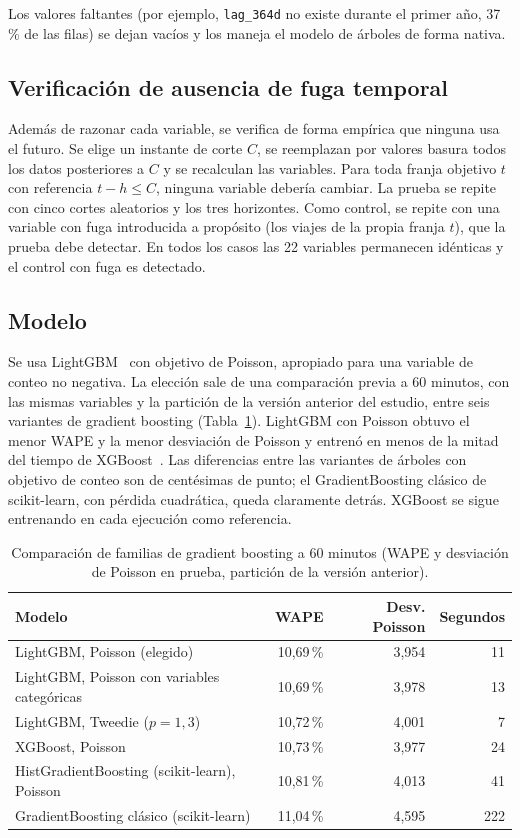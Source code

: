 \documentclass[11pt,a4paper]{article}
\begin{document}
Los valores faltantes (por ejemplo, \texttt{lag\_364d} no existe durante el primer año, 37\,\% de las filas) se dejan vacíos y los maneja el modelo de árboles de forma nativa.

\subsection{Verificación de ausencia de fuga temporal}

Además de razonar cada variable, se verifica de forma empírica que ninguna usa el futuro. Se elige un instante de corte $C$, se reemplazan por valores basura todos los datos posteriores a $C$ y se recalculan las variables. Para toda franja objetivo $t$ con referencia $t-h \le C$, ninguna variable debería cambiar. La prueba se repite con cinco cortes aleatorios y los tres horizontes. Como control, se repite con una variable con fuga introducida a propósito (los viajes de la propia franja $t$), que la prueba debe detectar. En todos los casos las 22 variables permanecen idénticas y el control con fuga es detectado.

\subsection{Modelo}

Se usa LightGBM~\cite{ke2017lightgbm} con objetivo de Poisson, apropiado para una variable de conteo no negativa. La elección sale de una comparación previa a 60 minutos, con las mismas variables y la partición de la versión anterior del estudio, entre seis variantes de gradient boosting (Tabla~\ref{tab:familias}). LightGBM con Poisson obtuvo el menor WAPE y la menor desviación de Poisson y entrenó en menos de la mitad del tiempo de XGBoost~\cite{chen2016xgboost}. Las diferencias entre las variantes de árboles con objetivo de conteo son de centésimas de punto; el GradientBoosting clásico de scikit-learn, con pérdida cuadrática, queda claramente detrás. XGBoost se sigue entrenando en cada ejecución como referencia.

\begin{table}[H]
  \centering
  \caption{Comparación de familias de gradient boosting a 60 minutos (WAPE y desviación de Poisson en prueba, partición de la versión anterior).}
  \label{tab:familias}
  \small
  \begin{tabular}{lrrr}
    \toprule
    Modelo & WAPE & Desv. Poisson & Segundos \\
    \midrule
    LightGBM, Poisson (elegido) & 10,69\,\% & 3,954 & 11 \\
    LightGBM, Poisson con variables categóricas & 10,69\,\% & 3,978 & 13 \\
    LightGBM, Tweedie ($p=1{,}3$) & 10,72\,\% & 4,001 & 7 \\
    XGBoost, Poisson & 10,73\,\% & 3,977 & 24 \\
    HistGradientBoosting (scikit-learn), Poisson & 10,81\,\% & 4,013 & 41 \\
    GradientBoosting clásico (scikit-learn) & 11,04\,\% & 4,595 & 222 \\
    \bottomrule
  \end{tabular}
\end{table}
\end{document}
